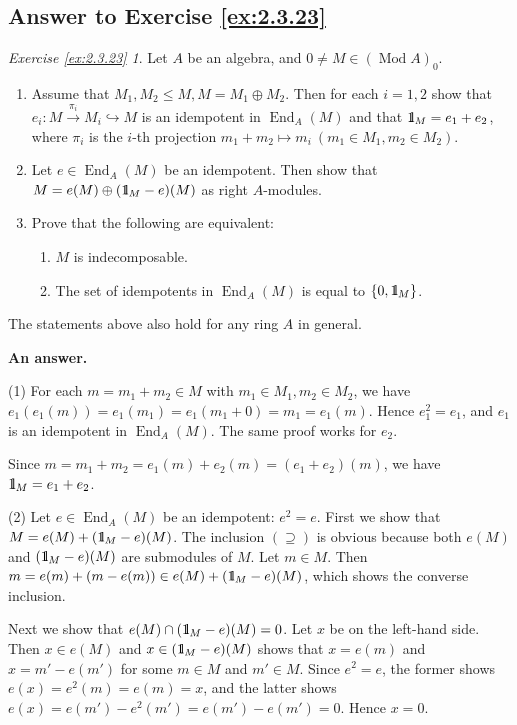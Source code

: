 \documentclass{surv-l}
\numberwithin{equation}{chapter}
\numberwithin{figure}{chapter}
\theoremstyle{plain}
\theoremstyle{definition}
\theoremstyle{remark}
\newcommand{\id}{1\kern-.25em{\text{{\rm l}}}}
\DeclareMathOperator{\End}{End}
\DeclareMathOperator{\Mod}{Mod}
\begin{document}
\subsection{Answer to Exercise \protect\ref{ex:2.3.23}}\label{sec:exc2.3.23}
\newtheorem*{exc23}{Exercise \ref{ex:2.3.23}}
\begin{exc23}
Let $A$ be an algebra, and $0 \ne M \in (\Mod A)_0$.
\begin{enumerate}
\item
Assume that $M_1, M_2 \le M, M = M_1 \oplus M_2$.
Then for each $i = 1,2$ show that
$e_i \colon M \xrightarrow{\pi_i} M_i \hookrightarrow M$
is an idempotent in $\End_A(M)$ and that
$\id_M = e_1 +e_2$, where
$\pi_i$ is the $i$-th projection
$m_1+m_2 \mapsto m_i\ (m_1 \in M_1, m_2 \in M_2)$.
\item
Let $e \in \End_A(M)$ be an idempotent.
Then show that $M = e(M) \oplus (\id_M -e)(M)$
as right $A$-modules.

\pagebreak

\item
Prove that the following are equivalent:
\begin{enumerate}
\item
$M$ is indecomposable.
\item
The set of idempotents in $\End_A(M)$ is equal to $\{0, \id_M\}$.
\end{enumerate}
\end{enumerate}
The statements above also hold for any ring $A$ in general.
\end{exc23}

{\bf An answer.}

(1) For each $m = m_1 + m_2 \in M$ with $m_1 \in M_1, m_2 \in M_2$,
we have $e_1(e_1(m)) = e_1(m_1) = e_1(m_1 + 0) = m_1 = e_1(m)$.
Hence $e_1^2 = e_1$, and $e_1$ is an idempotent in $\End_A(M)$.
The same proof works for $e_2$.

Since $m = m_1 + m_2 = e_1(m) + e_2(m) = (e_1 + e_2)(m)$,
we have $\id_M = e_1 + e_2$.

(2) Let $e \in \End_A(M)$ be an idempotent: $e^2 = e$.
First we show that $M = e(M) + (\id_M - e)(M)$.
The inclusion $(\supseteq)$ is obvious because
both $e(M)$ and $(\id_M - e)(M)$ are submodules of $M$.
Let $m \in M$.
Then $m = e(m) + (m - e(m)) \in e(M) + (\id_M - e)(M)$,
which shows the converse inclusion.

Next we show that $e(M) \cap (\id_M - e)(M) = 0$.
Let $x$ be on the left-hand side.
Then $x \in e(M)$ and $x \in (\id_M - e)(M)$ shows that
$x = e(m)$ and $x = m' - e(m')$ for some
$m \in M$ and $m' \in M$.
Since $e^2 = e$, the former shows $e(x) = e^2(m) = e(m) = x$,
and the latter shows $e(x) = e(m') - e^2(m') = e(m') - e(m') = 0$.
Hence $x = 0$.
\end{document}
